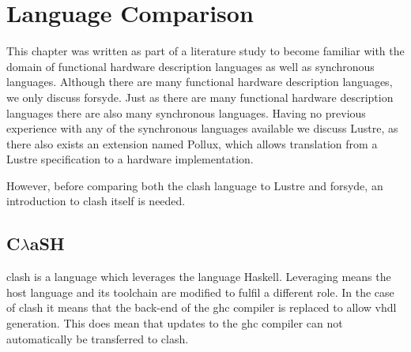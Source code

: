 \newcommand{\framedhslinecorrect}[2]%
  {#1[#2]}

\newcommand{\framedhs}{\sethscode{framedhscode}}


\newenvironment{inlinehscode}%
  {\(\def\column##1##2{}%
   \let\>\undefined\let\<\undefined\let\\\undefined
   \newcommand\>[1][]{}\newcommand\<[1][]{}\newcommand\\[1][]{}%
   \def\fromto##1##2##3{##3}%
   \def\nextline{}}{\) }%

\newcommand{\inlinehs}{\sethscode{inlinehscode}}


\newenvironment{joincode}%
  {\let\orighscode=\hscode
   \let\origendhscode=\endhscode
   \def\endhscode{\def\hscode{\endgroup\def\@currenvir{hscode}\\}\begingroup}
   \orighscode\def\hscode{\endgroup\def\@currenvir{hscode}}}%
  {\origendhscode
   \global\let\hscode=\orighscode
   \global\let\endhscode=\origendhscode}%

\makeatother
\EndFmtInput
%

\chapter{Language Comparison} \label{ch:lang}
This chapter was written as part of a literature study to become familiar with the domain of functional hardware description languages as well as synchronous languages.
Although there are many functional hardware description languages, we only discuss \gls{forsyde}\cite{sander2004system}.
Just as there are many functional hardware description languages there are also many synchronous languages.
Having no previous experience with any of the synchronous languages available we discuss Lustre\cite{halbwachs1991synchronous}, as there also exists an extension named Pollux\cite{rocheteau1994pollux}, which allows translation from a Lustre specification to a hardware implementation.

However, before comparing both the \gls{clash} language to Lustre and \gls{forsyde}, an introduction to \gls{clash} itself is needed.
\section{C$\lambda$aSH}
\Gls{clash} is a language which leverages the language Haskell\cite{jones2003haskell}. 
Leveraging means the host language and its toolchain are modified to fulfil a different role.
In the case of \gls{clash} it means that the back-end of the \gls{ghc} compiler is replaced to allow \gls{vhdl} generation.
This does mean that updates to the \gls{ghc} compiler can not automatically be transferred to \gls{clash}.

